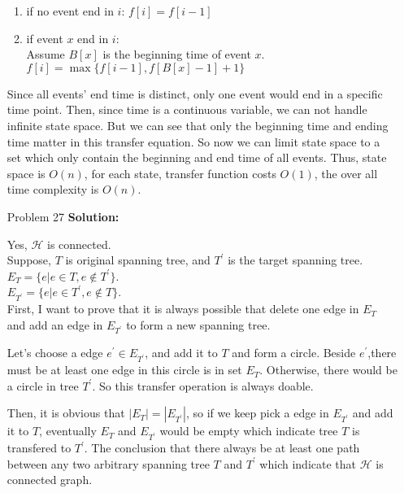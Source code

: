\normalfont\documentclass[letterpaper,11pt]{article}
\begin{document}
\begin{enumerate}
\begin{enumerate}
		\item if no event end in $i$: $f[i] = f[i-1]$
		\item if event $x$ end in $i$:\\
			Assume $B[x]$ is the beginning time of event $x$.\\
			$f[i] = \max\{f[i-1], f[B[x] - 1] + 1\}$
	\end{enumerate}
			Since all events' end time is distinct, only one event would end in a specific time point.
			Then, since time is a continuous variable, we can not handle infinite state space. But we can see that only the beginning time and ending time matter in this transfer equation. So now we can limit state space to a set which only contain the beginning and end time of all events.
			Thus, state space is $O(n)$, for each state, transfer function costs $O(1)$, the over all time complexity is $O(n)$.
	
\item [Problem 27]\textbf{Solution:}\par
Yes, $\mathcal{H}$ is connected.\\
Suppose, $T$ is original spanning tree, and $T^\prime$ is the target spanning tree. \\
$E_T = \{e| e \in T, e \not\in T^\prime\}$.\\
$E_{T^\prime} = \{e| e \in T^\prime, e \not\in T\}$.\\
First, I want to prove that it is always possible that delete one edge in $E_T$ and add an edge in $E_{T^\prime}$ to form a new spanning tree.\par
Let's choose a edge $e^\prime \in E_{T^\prime}$, and add it to $T$ and form a circle. Beside $e^\prime$,there must be at least one edge in this circle is in set $E_T$. Otherwise, there would be a circle in tree $T^\prime$. So this transfer operation is always doable.\par
Then, it is obvious that $|E_T| = |E_{T^\prime}|$, so if we keep pick a edge in $E_{T^\prime}$ and add it to $T$, eventually $E_T$ and $E_{T^\prime}$ would be empty which indicate tree $T$ is transfered to $T^\prime$. The conclusion that there always be at least one path between any two arbitrary spanning tree $T$ and $T^\prime$ which indicate that $\mathcal{H}$ is connected graph.

\end{enumerate}
\end{document}
